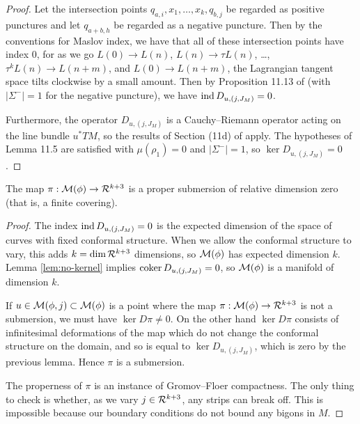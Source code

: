 \documentclass[12pt]{amsart}
\begin{document}
\begin{proof}
  Let the intersection points $q_{a,i},x_1,\dots,x_k,q_{b,j}$ be
  regarded as positive punctures and let $q_{a+b,h}$ be regarded as a
  negative puncture. Then by the conventions for Maslov index, we have
  that all of these intersection points have index $0$, for as we go
  $L(0)\to L(n)$, $L(n) \to \tau L(n)$, \dots, $\tau^k L(n) \to
  L(n+m)$, and $L(0) \to L(n+m)$, the Lagrangian tangent space tilts
  clockwise by a small amount. Then by Proposition 11.13 of
  \cite{seidel-book} (with $|\Sigma^-| = 1$ for the negative
  puncture), we have $\operatorname{ind} D_{u,(j,J_M)} = 0$.

  Furthermore, the operator $D_{u,(j,J_M)}$ is a Cauchy--Riemann operator acting on
  the line bundle $u^*TM$, so the results of Section (11d) of
  \cite{seidel-book} apply. The hypotheses of Lemma 11.5 are satisfied
  with $\mu(\rho_1) = 0$ and $|\Sigma^-| = 1$, so $\ker D_{u,(j,J_M)}
  = 0$.
\end{proof}

\begin{lemma}
  \label{lem:covering}
  The map $\pi: \mathcal{M}(\phi) \to \mathcal{R}^{k+3}$ is a proper submersion of
  relative dimension zero (that is, a finite covering).
\end{lemma}

\begin{proof}
  The index $\operatorname{ind} D_{u,(j,J_M)} = 0$ is the expected dimension of the space of curves with fixed conformal structure. When we allow the conformal structure to vary, this adds $k = \dim \mathcal{R}^{k+3}$ dimensions, so $\mathcal{M}(\phi)$ has expected dimension $k$. Lemma \ref{lem:no-kernel} implies $\operatorname{coker} D_{u,(j,J_M)} = 0$, so $\mathcal{M}(\phi)$ is a manifold of dimension $k$.


  If $u \in \mathcal{M}(\phi,j) \subset \mathcal{M}(\phi)$ is a point where the map
  $\pi: \mathcal{M}(\phi) \to \mathcal{R}^{k+3}$ is not a submersion, we must have
  $\ker D\pi \neq 0$. On the other hand $\ker D\pi$ consists of
  infinitesimal deformations of the map which do not change the
  conformal structure on the domain, and so is equal to $\ker
  D_{u,(j,J_M)}$, which is zero by the previous lemma. Hence $\pi$ is
  a submersion.

  The properness of $\pi$ is an instance of Gromov--Floer
  compactness. The only thing to check is whether, as we vary $j \in
  \mathcal{R}^{k+3}$, any strips can break off. This is impossible because our
  boundary conditions do not bound any bigons in $M$.
\end{proof}
\end{document}
